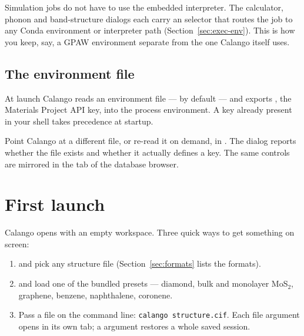 \begin{caltip}
Simulation jobs do not have to use the embedded interpreter. The
calculator, phonon and band-structure dialogs each carry an
 selector that routes the job to any Conda
environment or interpreter path (Section~\ref{sec:exec-env}). This is how
you keep, say, a GPAW environment separate from the one Calango itself
uses.
\end{caltip}

\subsection{The environment file}
\label{sec:envfile}

At launch Calango reads an environment file --- 
by default --- and exports , the Materials Project API
key, into the process environment. A key already present in your shell
takes precedence at startup.

Point Calango at a different file, or re-read it on demand, in
\menusep{}. The dialog reports whether the file
exists and whether it actually defines a key. The same controls are
mirrored in the  tab of the database browser.

\section{First launch}

Calango opens with an empty workspace. Three quick ways to get something
on screen:

\begin{enumerate}
  \item {}\menusep{}\menusep{} and pick any
    structure file (Section~\ref{sec:formats} lists the formats).
  \item {}\menusep{} and load one of the
    bundled presets --- diamond, bulk and monolayer MoS$_2$, graphene,
    benzene, naphthalene, coronene.
  \item Pass a file on the command line: \lstinline|calango structure.cif|.
    Each file argument opens in its own tab; a  argument
    restores a whole saved session.
\end{enumerate}
